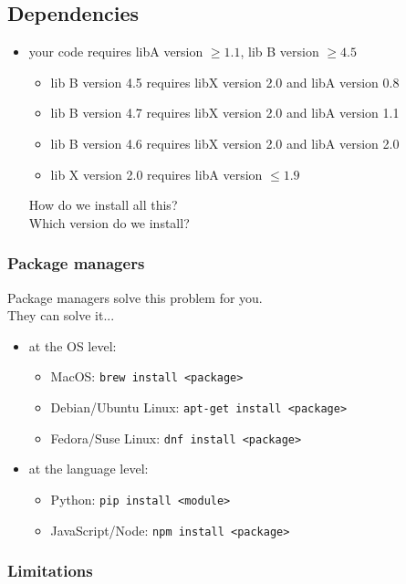 \documentclass[12pt]{article}
\begin{document}
\subsection{Dependencies}

\renewcommand{\labelitemii}{$\star$}
\begin{itemize}
  \item your code requires libA version $ \geq 1.1$, lib B version $ \geq 4.5$
  \begin{itemize}
    \item lib B version 4.5 requires libX version 2.0 and libA version 0.8
    \item lib B version 4.7 requires libX version 2.0 and libA version 1.1
    \item lib B version 4.6 requires libX version 2.0 and libA version 2.0
    \item lib X version 2.0 requires libA version $ \leq 1.9$
  \end{itemize}
  How do we install all this? \\
  Which version do we install?
\end{itemize}

\subsubsection{Package managers}

Package managers solve this problem for you. \\
They can solve it...

\begin{itemize}
  \item at the OS level:
  \begin{itemize}
    \item MacOS: \texttt{brew install <package>}
    \item Debian/Ubuntu Linux: \texttt{apt-get install <package>}
    \item Fedora/Suse Linux: \texttt{dnf install <package>}
  \end{itemize}
  \item at the language level:
  \begin{itemize}
    \item Python: \texttt{pip install <module>}
    \item JavaScript/Node: \texttt{npm install <package>}
  \end{itemize}
\end{itemize}

\subsubsection{Limitations}
\end{document}
